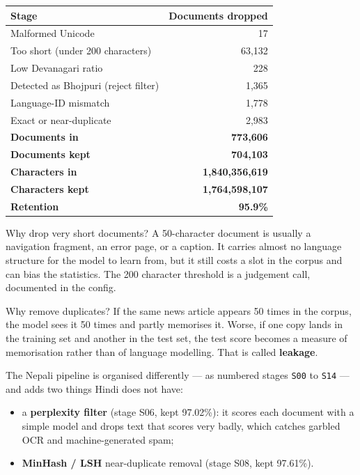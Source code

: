\documentclass[11pt]{report}
\newcommand{\p}[1]{\texttt{#1}}
\begin{document}
\begin{center}
\begin{tabular}{@{}lr@{}}
\toprule
\textbf{Stage} & \textbf{Documents dropped} \\
\midrule
Malformed Unicode & 17 \\
Too short (under 200 characters) & 63,132 \\
Low Devanagari ratio & 228 \\
Detected as Bhojpuri (reject filter) & 1,365 \\
Language-ID mismatch & 1,778 \\
Exact or near-duplicate & 2,983 \\
\midrule
\textbf{Documents in} & \textbf{773,606} \\
\textbf{Documents kept} & \textbf{704,103} \\
\textbf{Characters in} & \textbf{1,840,356,619} \\
\textbf{Characters kept} & \textbf{1,764,598,107} \\
\textbf{Retention} & \textbf{95.9\%} \\
\bottomrule
\end{tabular}
\end{center}

\begin{concept}{Why drop very short documents?}
A 50-character document is usually a navigation fragment, an error page, or a
caption. It carries almost no language structure for the model to learn from,
but it still costs a slot in the corpus and can bias the statistics. The 200
character threshold is a judgement call, documented in the config.
\end{concept}

\begin{concept}{Why remove duplicates?}
If the same news article appears 50 times in the corpus, the model sees it 50
times and partly memorises it. Worse, if one copy lands in the training set and
another in the test set, the test score becomes a measure of memorisation
rather than of language modelling. That is called \textbf{leakage}.
\end{concept}

The Nepali pipeline is organised differently --- as numbered stages \p{S00} to
\p{S14} --- and adds two things Hindi does not have:

\begin{itemize}
\item a \textbf{perplexity filter} (stage S06, kept 97.02\%): it scores each
      document with a simple model and drops text that scores very badly, which
      catches garbled OCR and machine-generated spam;
\item \textbf{MinHash / LSH} near-duplicate removal (stage S08, kept 97.61\%).
\end{itemize}
\end{document}
